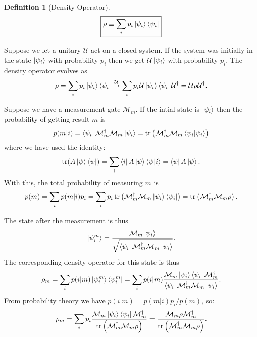 \documentclass{book}
\theoremstyle{definition}
\newtheorem{defn}{Definition}[section]
\newcommand{\M}{\mathcal{M}}
\newcommand{\f}[2]{\frac{#1}{#2}}
\newcommand{\lp}{\left(}
\newcommand{\rp}{\right)}
\newcommand{\U}{\mathcal{U}}
\begin{document}
\begin{defn}[Density Operator]
	\begin{align}
	\boxed{\rho \equiv \sum_i p_i \ket{\psi_i}\bra{\psi_i}}
	\end{align}
\end{defn}



Suppose we let a unitary $\U$ act on a closed system. If the system was initially in the state $\ket{\psi_i}$ with probability $p_i$ then we get $\U \ket{\psi_i}$ with probability $p_i$. The density operator evolves as
\begin{align}
\rho = \sum_i p_i \ket{\psi_i}\bra{\psi_i} \stackrel{\U}{\rightarrow} \sum_i p_i \U \ket{\psi_i}\bra{\psi_i}\U^\dagger = \U \rho \U^\dagger.
\end{align}


Suppose we have a measurement gate $\M_m$. If the intial state is $\ket{\psi_i}$ then the probability of getting result $m$ is 
\begin{align}
p(m\vert i) = \bra{\psi_i} \M_m^\dagger \M_m \ket{\psi_i} = \tr\lp \M_m^\dagger \M_m \braket{\psi_i} \rp
\end{align}
where we have used the identity:
\begin{align}
\tr(A\ket{\psi}\bra{\psi}) = \sum_i \bra{i}A \ket{\psi}\bra{\psi}\ket{i} = \bra{\psi}A\ket{\psi}.
\end{align}
With this, the total probability of measuring $m$ is 
\begin{align}
p(m) = \sum_i p(m|i)p_i = \sum_i p_i \tr\lp \M_m^\dagger \M_m \ket{\psi_i}\bra{\psi_i} \rp = \tr\lp \M_m^\dagger \M_m \rho \rp.
\end{align}

The state after the measurement is thus
\begin{align}
\ket{\psi_i^m} = \f{\M_m \ket{\psi_i}}{\sqrt{\bra{\psi_i}\M_m^\dagger \M_m \ket{\psi_i}}}.
\end{align}
The corresponding density operator for this state is thus
\begin{align}
\rho_m = \sum_i p(i|m)\ket{\psi_i^m}\bra{\psi_i^m} = \sum_i p(i|m)\f{\M_m \ket{\psi_i}\bra{\psi_i}\M_m^\dagger}{\bra{\psi_i}\M_m^\dagger \M_m \ket{\psi_i}}.
\end{align}
From probability theory we have $p(i|m) = p(m|i)p_i/p(m)$, so:
\begin{align}
\rho_m = \sum_i p_i \f{\M_m \ket{\psi_i}\bra{\psi_i}\M_m^\dagger}{\tr\lp \M^\dagger_m \M_m \rho \rp} = \f{\M_m \rho \M_m^\dagger}{\tr\lp \M_m^\dagger \M_m \rho \rp}.
\end{align}
\end{document}
